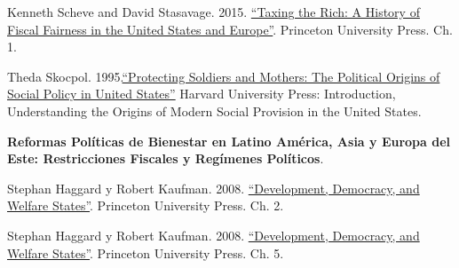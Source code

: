 \documentclass[letterpaper]{article}
\renewenvironment{itemize}{
  \begin{list}{}{
    \setlength{\leftmargin}{1.5em}
  }
}{
  \end{list}
}
\begin{document}
\begin{enumerate}[label=\roman*.]
\begin{itemize}
\begin{itemize}
          \item[$\circ$] Kenneth Scheve and David Stasavage. 2015. \href{https://github.com/hbahamonde/Ciencia_Politica_II/raw/master/Readings/Taxing_The_Rich.pdf}{``Taxing the Rich: A History of Fiscal Fairness in the United States and Europe''}. Princeton University Press. Ch. 1.
					
         
          
          \item[$\circ$] Theda Skocpol. 1995.\href{https://github.com/hbahamonde/Ciencia_Politica_II/raw/master/Readings/Skocpol_1995.pdf}{``Protecting Soldiers and Mothers: The Political Origins of Social Policy in United States''} Harvard University Press: Introduction, Understanding the Origins of Modern Social Provision in the United States.%



				\end{itemize}


			\item[18.] {\bf Reformas Pol\'iticas de Bienestar en Latino Am\'erica, Asia y Europa del Este: Restricciones Fiscales y Reg\'imenes Pol\'iticos}.
				\begin{itemize}
					\item[$\circ$] Stephan Haggard y Robert Kaufman. 2008. \href{https://github.com/hbahamonde/Ciencia_Politica_II/raw/master/Readings/Kaufman_Welfare.pdf}{``Development, Democracy, and Welfare States''}. Princeton University Press. Ch. 2.

          \item[$\circ$] Stephan Haggard y Robert Kaufman. 2008. \href{https://github.com/hbahamonde/Ciencia_Politica_II/raw/master/Readings/Kaufman_Welfare.pdf}{``Development, Democracy, and Welfare States''}. Princeton University Press. Ch. 5.

        \end{itemize}



\end{itemize}
\end{enumerate}
\end{document}
